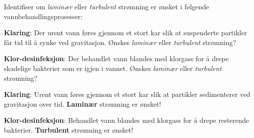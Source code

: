 

Identifiser om {\it laminær} eller {\it turbulent} strømning er ønsket i følgende vannbehandlingsprosesser:

\vskip 10pt

{\bf Klaring}: Der urent vann føres gjennom et stort kar slik at suspenderte partikler får tid til å synke ved gravitasjon. Ønskes {\it laminær} eller {\it turbulent} strømning?

\vskip 10pt

{\bf Klor-desinfeksjon}: Der behandlet vann blandes med klorgass for å drepe skadelige bakterier som er igjen i vannet. Ønskes {\it laminær} eller {\it turbulent} strømning?








{\bf Klaring}: Urent vann føres gjennom et stort kar slik at partikler sedimenterer ved gravitasjon over tid. {\bf Laminær} strømning er ønsket!

\vskip 10pt

{\bf Klor-desinfeksjon}: Behandlet vann blandes med klorgass for å drepe resterende bakterier. {\bf Turbulent} strømning er ønsket!
 









